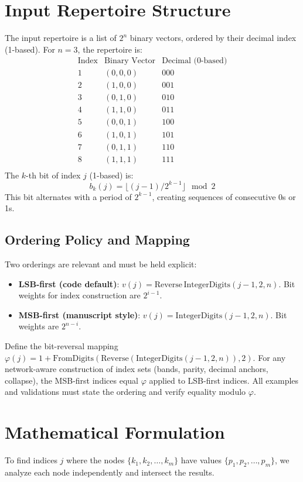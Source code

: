 \documentclass[12pt]{article}
\begin{document}
\section{Input Repertoire Structure}
The input repertoire is a list of \( 2^n \) binary vectors, ordered by their decimal index (1-based). For \( n = 3 \), the repertoire is:
\[
\begin{array}{ccc}
\text{Index} & \text{Binary Vector} & \text{Decimal (0-based)} \\
1 & (0, 0, 0) & 000 \\
2 & (1, 0, 0) & 001 \\
3 & (0, 1, 0) & 010 \\
4 & (1, 1, 0) & 011 \\
5 & (0, 0, 1) & 100 \\
6 & (1, 0, 1) & 101 \\
7 & (0, 1, 1) & 110 \\
8 & (1, 1, 1) & 111 \\
\end{array}
\]
The \( k \)-th bit of index \( j \) (1-based) is:
\[
b_k(j) = \lfloor (j-1) / 2^{k-1} \rfloor \mod 2
\]
This bit alternates with a period of \( 2^{k-1} \), creating sequences of consecutive 0s or 1s.

\subsection*{Ordering Policy and Mapping}
Two orderings are relevant and must be held explicit:
\begin{itemize}
 \item \textbf{LSB-first (code default)}: \(v(j)=\mathrm{Reverse}\,\mathrm{IntegerDigits}(j-1,2,n)\). Bit weights for index construction are \(2^{i-1}\).
 \item \textbf{MSB-first (manuscript style)}: \(v(j)=\mathrm{IntegerDigits}(j-1,2,n)\). Bit weights are \(2^{n-i}\).
\end{itemize}
Define the bit-reversal mapping \(\varphi(j)=1+\mathrm{FromDigits}(\mathrm{Reverse}(\mathrm{IntegerDigits}(j-1,2,n)),2)\). For any network-aware construction of index sets (bands, parity, decimal anchors, collapse), the MSB-first indices equal \(\varphi\) applied to LSB-first indices. All examples and validations must state the ordering and verify equality modulo \(\varphi\).

\section{Mathematical Formulation}
\label{sec:math_formulation}
To find indices \( j \) where the nodes \( \{k_1, k_2, \dots, k_m\} \) have values \( \{p_1, p_2, \dots, p_m\} \), we analyze each node independently and intersect the results.
\end{document}
